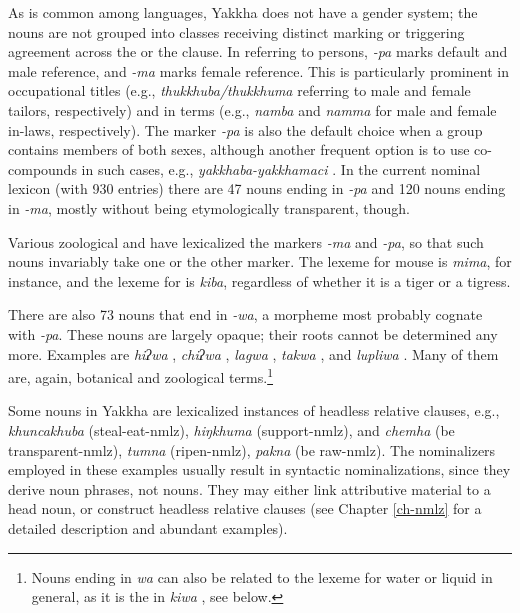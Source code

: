 As is common among  languages, Yakkha does not have a gender system; the nouns are not grouped into classes receiving distinct marking or triggering agreement across the  or the clause. In  referring to persons, \emph{-pa} marks default and male reference, and \emph{-ma} marks female reference. This is particularly prominent in occupational titles (e.g., \emph{thukkhuba/thukkhuma} referring to male and female tailors, respectively) and in  terms (e.g., \emph{namba} and \emph{namma} for male and female in-laws, respectively). The marker \emph{-pa} is also the default choice when a group contains members of both sexes, although another frequent option is to use co-compounds in such cases, e.g., \emph{yakkhaba-yakkhamaci} . In the current nominal lexicon (with 930 entries)  there are 47 nouns ending in \emph{-pa} and 120 nouns ending in \emph{-ma},  mostly without being  etymologically transparent, though.

Various zoological and  have lexicalized the markers \emph{-ma} and \emph{-pa}, so that such nouns invariably take one or the other marker. The lexeme  for mouse is \emph{mima},  for instance,  and the lexeme for  is  \emph{kiba}, regardless of whether it is a  tiger or a tigress.

There are also 73 nouns that end in \emph{-wa}, a morpheme most probably cognate with \emph{-pa}. These nouns are largely opaque; their roots cannot be determined any more. Examples are \emph{hiʔwa} , \emph{chiʔwa} , \emph{lagwa} , \emph{takwa} , and \emph{lupliwa} . Many of them are, again,  botanical and zoological terms.\footnote{Nouns ending in \emph{wa} can also be related to the lexeme for water or liquid in general, as it is the  in \emph{kiwa} , see below.}

Some nouns in Yakkha are lexicalized instances of headless relative clauses, e.g.,  \emph{khuncakhuba}  (steal-eat-{\sc nmlz}), \emph{hiŋkhuma}  (support-{\sc nmlz}), and \emph{chemha}  (be transparent-{\sc nmlz}),  \emph{tumna}  (ripen-{\sc nmlz}), \emph{pakna}  (be raw-{\sc nmlz}). The nominalizers employed in these examples usually result in syntactic nominalizations, since they derive noun phrases, not nouns. They may either link attributive material to a head noun, or  construct headless relative clauses  (see  Chapter \ref{ch-nmlz} for a detailed description and abundant examples). 



